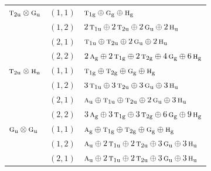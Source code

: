 \documentclass[11pt]{article}
\newcommand{\irr}[1]{\text{\normalfont\scshape #1}}
\newcommand{\ptag}[1]{\mathrm{#1}}
\begin{document}
\begin{longtable}{p{} c p{}}
\hline

$\irr{t}_{2\ptag{u}}\otimes \irr{g}_{\ptag{u}}$ & $(1,1)$ & $\irr{t}_{1\ptag{g}}\oplus \irr{g}_{\ptag{g}}\oplus \irr{h}_{\ptag{g}}$\\

 & $(1,2)$ & $2\,\irr{t}_{1\ptag{u}}\oplus 2\,\irr{t}_{2\ptag{u}}\oplus 2\,\irr{g}_{\ptag{u}}\oplus 2\,\irr{h}_{\ptag{u}}$\\

 & $(2,1)$ & $\irr{t}_{1\ptag{u}}\oplus \irr{t}_{2\ptag{u}}\oplus 2\,\irr{g}_{\ptag{u}}\oplus 2\,\irr{h}_{\ptag{u}}$\\

 & $(2,2)$ & $2\,\irr{a}_{\ptag{g}}\oplus 2\,\irr{t}_{1\ptag{g}}\oplus 2\,\irr{t}_{2\ptag{g}}\oplus 4\,\irr{g}_{\ptag{g}}\oplus 6\,\irr{h}_{\ptag{g}}$\\

\hline

$\irr{t}_{2\ptag{u}}\otimes \irr{h}_{\ptag{u}}$ & $(1,1)$ & $\irr{t}_{1\ptag{g}}\oplus \irr{t}_{2\ptag{g}}\oplus \irr{g}_{\ptag{g}}\oplus \irr{h}_{\ptag{g}}$\\

 & $(1,2)$ & $3\,\irr{t}_{1\ptag{u}}\oplus 3\,\irr{t}_{2\ptag{u}}\oplus 3\,\irr{g}_{\ptag{u}}\oplus 3\,\irr{h}_{\ptag{u}}$\\

 & $(2,1)$ & $\irr{a}_{\ptag{u}}\oplus \irr{t}_{1\ptag{u}}\oplus \irr{t}_{2\ptag{u}}\oplus 2\,\irr{g}_{\ptag{u}}\oplus 3\,\irr{h}_{\ptag{u}}$\\

 & $(2,2)$ & $3\,\irr{a}_{\ptag{g}}\oplus 3\,\irr{t}_{1\ptag{g}}\oplus 3\,\irr{t}_{2\ptag{g}}\oplus 6\,\irr{g}_{\ptag{g}}\oplus 9\,\irr{h}_{\ptag{g}}$\\

\hline

$\irr{g}_{\ptag{u}}\otimes \irr{g}_{\ptag{u}}$ & $(1,1)$ & $\irr{a}_{\ptag{g}}\oplus \irr{t}_{1\ptag{g}}\oplus \irr{t}_{2\ptag{g}}\oplus \irr{g}_{\ptag{g}}\oplus \irr{h}_{\ptag{g}}$\\

 & $(1,2)$ & $\irr{a}_{\ptag{u}}\oplus 2\,\irr{t}_{1\ptag{u}}\oplus 2\,\irr{t}_{2\ptag{u}}\oplus 3\,\irr{g}_{\ptag{u}}\oplus 3\,\irr{h}_{\ptag{u}}$\\

 & $(2,1)$ & $\irr{a}_{\ptag{u}}\oplus 2\,\irr{t}_{1\ptag{u}}\oplus 2\,\irr{t}_{2\ptag{u}}\oplus 3\,\irr{g}_{\ptag{u}}\oplus 3\,\irr{h}_{\ptag{u}}$\\


\end{longtable}
\end{document}
